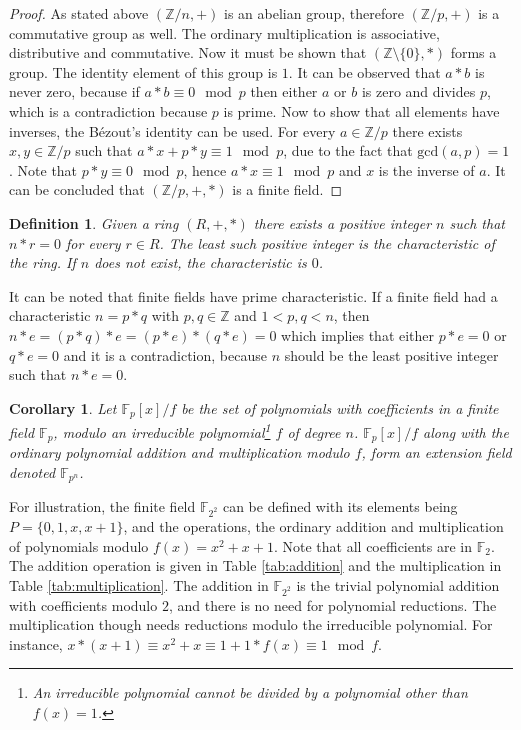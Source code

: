 \documentclass{ufsctex/ufsctex}
\newtheorem{definition}{Definition}
\newtheorem{corollary}{Corollary}
\begin{document}
\begin{proof}
As stated above $(\mathbb{Z}/n, +)$ is an abelian group, therefore
$(\mathbb{Z}/p, +)$ is a commutative group as well. The ordinary multiplication
is associative, distributive and commutative. Now it must be shown that
$(\mathbb{Z} \setminus \{0\}, *)$ forms a group. The identity element of this
group is $1$. It can be observed that $a*b$ is never zero, because if $a*b
\equiv 0 \mod p$ then either $a$ or $b$ is zero and divides $p$, which is a
contradiction because $p$ is prime.  Now to show that all elements have
inverses, the Bézout's identity can be used.  For every $a \in \mathbb{Z}/p$
there exists $x, y \in \mathbb{Z}/p$ such that $a*x + p*y \equiv 1 \mod p$, due
to the fact that $\text{gcd}(a, p) = 1$. Note that $p*y \equiv 0 \mod p$, hence
$a*x \equiv 1 \mod p$ and $x$ is the inverse of $a$. It can be concluded that
$(\mathbb{Z}/p, +, *)$ is a finite field.
\end{proof}

\begin{definition}
Given a ring $(R, +, *)$ there exists a positive integer $n$ such that $n*r =
0$ for every $r \in R$. The least such positive integer is the characteristic
of the ring. If $n$ does not exist, the characteristic is $0$.
\end{definition}

It can be noted that finite fields have prime characteristic. If a finite field
had a characteristic $n = p*q$ with $p, q \in \mathbb{Z}$ and $1 < p,q < n$,
then $n*e = (p*q)*e = (p*e)*(q*e) = 0$ which implies that either $p*e = 0$ or
$q*e = 0$ and it is a contradiction, because $n$ should be the least positive
integer such that $n*e = 0$.

\begin{corollary}\label{cor:extension}
Let $\mathbb{F}_p[x]/f$ be the set of polynomials with coefficients in a finite
field $\mathbb{F}_p$, modulo an irreducible polynomial\footnote{An irreducible
polynomial cannot be divided by a polynomial other than $f(x) = 1$.} $f$ of
degree $n$. $\mathbb{F}_p[x]/f$ along with the ordinary polynomial addition and
multiplication modulo $f$, form an extension field denoted $\mathbb{F}_{p^n}$.
\end{corollary}

For illustration, the finite field $\mathbb{F}_{2^2}$ can be defined with its
elements being $P = \{0, 1, x, x+1\}$, and the operations, the ordinary
addition and multiplication of polynomials modulo $f(x) = x^2 + x + 1$. Note
that all coefficients are in $\mathbb{F}_2$. The addition operation is given in
Table \ref{tab:addition} and the multiplication in Table
\ref{tab:multiplication}. The addition in $\mathbb{F}_{2^2}$ is the trivial
polynomial addition with coefficients modulo $2$, and there is no need for
polynomial reductions. The multiplication though needs reductions modulo the
irreducible polynomial. For instance, $x*(x+1) \equiv x^2+x \equiv 1 + 1*f(x)
\equiv 1 \mod f$.
\end{document}
